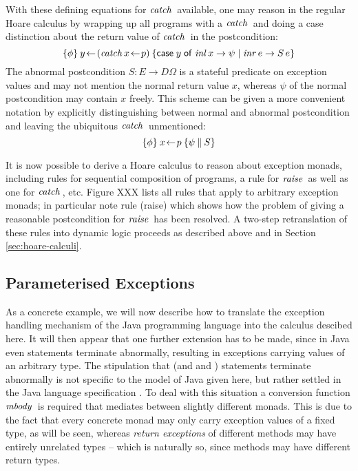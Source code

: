 With these defining equations for $\mathit{catch}\,$ available, one may reason in the
regular Hoare calculus by wrapping up all programs with a $\mathit{catch}\,$ and doing a
case distinction about the return value of $\mathit{catch}\,$ in the postcondition:
\[
\{\phi\}\:y \!\gets\! (\mathit{catch}\, x \!\gets\! p)\:\{\mathsf{case}\; y \;\mathsf{of}\; \mathit{inl}\, x \to \psi \;|\; \mathit{inr}\, e \to S\,e\}
\]
The abnormal postcondition $S : E \to D\Omega$ is a stateful predicate on exception
values and may not mention the normal return value $x$, whereas $\psi$ of the
normal postcondition may contain $x$ freely. This scheme can be given a more
convenient notation by explicitly distinguishing between normal and abnormal
postcondition and leaving the ubiquitous $\mathit{catch}\,$ unmentioned:
\[
\{\phi\}\:x \!\gets\! p\:\{\psi\:\|\:S\}
\]

It is now possible to derive a Hoare calculus to reason about
exception monads, including rules for sequential composition of
programs, a rule for $\mathit{raise}\,$ as well as one for $\mathit{catch}\,$, etc.
Figure XXX lists all rules that apply to arbitrary exception monads;
in particular note rule (raise) which shows how the problem of giving
a reasonable postcondition for $\mathit{raise}\,$ has been resolved. A
two-step retranslation of these rules into dynamic logic proceeds as
described above and in Section \ref{sec:hoare-calculi}.

\subsection{Parameterised Exceptions}
\label{sec:param-except}

As a concrete example, we will now describe how to translate the exception
handling mechanism of the Java programming language into the calculus descibed
here. It will then appear that one further extension has to be made, since in
Java even  statements terminate abnormally, resulting in exceptions
carrying values of an arbitrary type. The stipulation that  (and
 and ) statements terminate abnormally is not
specific to the model of Java given here, but rather settled in the Java
language specification \cite{JoySteeleGoslingBracha00}.  To deal with this
situation a conversion function $\mathit{mbody}\,$ is required that mediates between
slightly different monads. This is due to the fact that every concrete monad may only
carry exception values of a fixed type, as will be seen, whereas \emph{return
  exceptions} of different methods may have entirely unrelated types -- which is
naturally so, since methods may have different return types.

